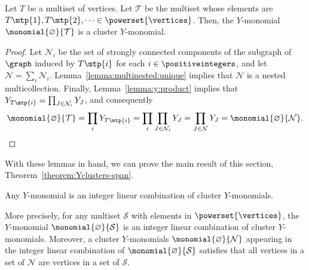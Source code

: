 \begin{lemm} \label{lemma:multiset:cluster}
    Let \(T\) be a multiset of vertices.
    Let \(\mathcal{T}\) be the multiset whose elements are \(T\mtp{1}, T\mtp{2}, \dots \in \powerset{\vertices}\).
    Then, the \(Y\)-monomial \(\monomial{\varnothing}{\mathcal{T}}\) is a cluster \(Y\)-monomial.
\end{lemm}

\begin{proof}
    Let \(\mathcal{N}_i\) be the set of strongly connected components of the subgraph of \(\graph\) induced by \(T\mtp{i}\) for each \(i \in \positiveintegers\),
    and let \(\mathcal{N} = \sum_i \mathcal{N}_i\).
    Lemma~\ref{lemma:multinested:unique} implies that \(\mathcal{N}\) is a nested multicollection.
    Finally, Lemma~\ref{lemma:y:product} implies that \(Y_{T\mtp{i}} = \prod_{J \in \mathcal{N}_i} Y_J\),
    and consequently
    \begin{equation*}
        \monomial{\varnothing}{\mathcal{T}}
        = \prod_{i} Y_{T\mtp{i}}
        = \prod_{i} \prod_{J \in \mathcal{N}_i} Y_J
        = \prod_{J \in \mathcal{N}} Y_J
        = \monomial{\varnothing}{\mathcal{N}}. \qedhere
    \end{equation*}
\end{proof}

With these lemmas in hand, we can prove the main result of this section, Theorem~\ref{theorem:Yclusters-span}.

\begin{theo*}
    Any \(Y\)-monomial is an integer linear combination of cluster \(Y\)-monomials.

    More precisely, for any multiset \(\mathcal{S}\) with elements in \(\powerset{\vertices}\), the \(Y\)-monomial \(\monomial{\varnothing}{\mathcal{S}}\) is an integer linear combination of cluster \(Y\)-monomials.
    Moreover, a cluster \(Y\)-monomials \(\monomial{\varnothing}{\mathcal{N}}\) appearing in the integer linear combination of \(\monomial{\varnothing}{\mathcal{S}}\) satisfies that all vertices in a set of \(\mathcal{N}\) are vertices in a set of \(\mathcal{S}\).
\end{theo*}

